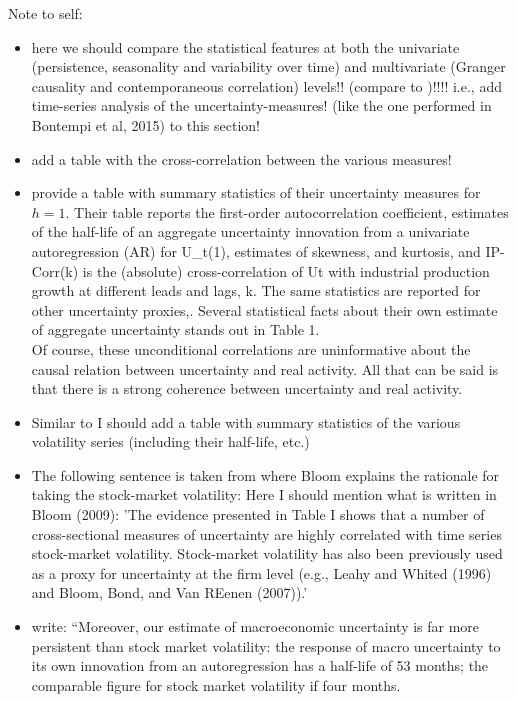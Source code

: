 \documentclass[a4paper,12pt,oneside,pointednumbers,bibtotoc,bigheadings,liststotoc]{scrbook}
\begin{document}
\begingroup
    \fontsize{8pt}{12pt}\selectfont
    Note to self:
\begin{itemize}
	\item here we should compare the statistical features at both the univariate (persistence, seasonality and variability over time) and multivariate (Granger causality and contemporaneous correlation) levels!! (compare to \citet{bontempietal:16})!!!! i.e., add time-series analysis of the uncertainty-measures! (like the one performed in Bontempi et al, 2015) to this section!
	\item add a table with the cross-correlation between the various measures!
	\item \citet{juradoetal:15} provide a table with summary statistics of their uncertainty measures for $h=1$. Their table reports the first-order autocorrelation coefficient, estimates of the half-life of an aggregate uncertainty innovation from a univariate autoregression (AR) for U_t(1), estimates of skewness, and kurtosis, and IP-Corr(k) is the (absolute) cross-correlation of Ut with industrial production growth at different leads and lags, k. The same statistics are reported for other uncertainty proxies,. Several statistical facts about their own estimate of aggregate uncertainty stands out in Table 1. \\
	Of course, these unconditional correlations are uninformative about the causal relation between uncertainty and real activity. All that can be said is that there is a strong coherence between uncertainty and real activity.
	\item Similar to \citet{juradoetal:15} I should add a table with summary statistics of the various volatility series (including their half-life, etc.)
	\item The following sentence is taken from \citet{bloom:09} where Bloom explains the rationale for taking the stock-market volatility: Here I should mention what is written in Bloom (2009): 'The evidence presented in Table I shows that a number of cross-sectional measures of uncertainty are highly correlated with time series stock-market volatility. Stock-market volatility has also been previously used as a proxy for uncertainty at the firm level (e.g., Leahy and Whited (1996) and Bloom, Bond, and Van REenen (2007)).'
	\item \citet[p. 1180]{juradoetal:15} write: ``Moreover, our estimate of macroeconomic uncertainty is far more persistent than stock market volatility: the response of macro uncertainty to its own innovation from an autoregression has a half-life of 53 months; the comparable figure for stock market volatility if four months.

\end{itemize}
\end{document}
